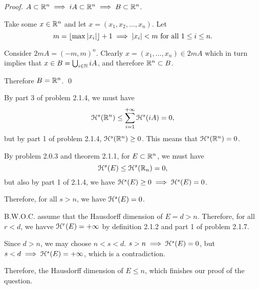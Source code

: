 \textit{Proof.} \(A \subset \mathbb{R}^n \implies iA \subset \mathbb{R}^n \implies B \subset \mathbb{R}^n\).

Take some \(x \in \mathbb{R}^n\) and let \(x = (x_1, x_2, \ldots, x_n)\). Let
\[
m = \lfloor\max |x_i|\rfloor + 1 \implies |x_i| < m \text{ for all } 1 \leq i \leq n.
\]

Consider \(2mA = (-m, m)^n\). Clearly \(x = \left(x_1, \ldots, x_n\right) \in 2mA\) which in turn implies that \(x \in B = \bigcup_{i \in \mathbb{N}} iA\), and therefore \(\mathbb{R}^n \subset B\).

Therefore \(B = \mathbb{R}^n\). \qed

By part 3 of problem 2.1.4, we must have
\[
\mathcal{H}^s (\mathbb{R}^n) \leq \sum_{i = 1}^{+\infty} \mathcal{H}^s(iA) = 0,
\]
but by part 1 of problem 2.1.4, \(\mathcal{H}^s (\mathbb{R}^n) \geq 0\). This means that \(\mathcal{H}^s(\mathbb{R}^n) = 0\).

By problem 2.0.3 and theorem 2.1.1, for \(E \subset \mathbb{R}^n\), we must have
\[
\mathcal{H}^s(E) \leq \mathcal{H}^s (\mathbb{R}_n) = 0,
\]
but also by part 1 of 2.1.4, we have \(\mathcal{H}^s(E) \geq 0 \implies \mathcal{H}^s(E) = 0\).

Therefore, for all \(s > n\), we have \(\mathcal{H}^s(E) = 0\).

B.W.O.C. assume that the Hausdorff dimension of \(E = d > n\). Therefore, for all \(r < d\), we havve \(\mathcal{H}^r(E) = +\infty\) by definition 2.1.2 and part 1 of problem 2.1.7.

Since \(d > n\), we may choose \(n < s < d\). \(s > n \implies \mathcal{H}^s(E) = 0\), but \(s < d \implies \mathcal{H}^s(E) = +\infty\), which is a contradiction.

Therefore, the Hausdorff dimension of \(E \leq n\), which finishes our proof of the question.